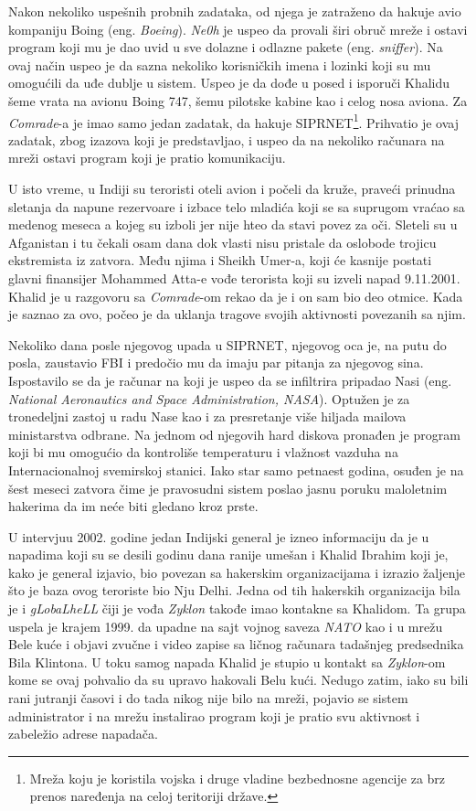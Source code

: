 \documentclass[a4paper]{article}
\begin{document}
Nakon nekoliko uspešnih probnih zadataka, od njega je zatraženo da hakuje avio kompaniju Boing (eng. \textit{Boeing}). \textit{Ne0h} je uspeo da provali širi obruč mreže i ostavi program koji mu je dao uvid u sve dolazne i odlazne pakete (eng. \textit{sniffer}). Na ovaj način uspeo je da sazna nekoliko korisničkih imena i lozinki koji su mu omogućili da uđe dublje u sistem. Uspeo je da dođe u posed i isporuči Khalidu šeme vrata na avionu Boing 747, šemu pilotske kabine kao i celog nosa aviona. Za \textit{Comrade}-a je imao samo jedan zadatak, da hakuje SIPRNET\footnote{Mreža koju je koristila vojska i druge vladine bezbednosne agencije za brz prenos naređenja na celoj teritoriji države.}. Prihvatio je ovaj zadatak, zbog izazova koji je predstavljao, i uspeo da na nekoliko računara na mreži ostavi program koji je pratio komunikaciju.

U isto vreme, u Indiji su teroristi oteli avion i počeli da kruže, praveći prinudna sletanja da napune rezervoare i izbace telo mladića koji se sa suprugom vraćao sa medenog meseca a kojeg su izboli jer nije hteo da stavi povez za oči. Sleteli su u Afganistan i tu čekali osam dana dok vlasti nisu pristale da oslobode trojicu ekstremista iz zatvora. Među njima i Sheikh Umer-a, koji će kasnije postati glavni finansijer Mohammed Atta-e vođe terorista koji su izveli napad 9.11.2001. Khalid je u razgovoru sa \textit{Comrade}-om rekao da je i on sam bio deo otmice. Kada je saznao za ovo, počeo je da uklanja tragove svojih aktivnosti povezanih sa njim.

Nekoliko dana posle njegovog upada u SIPRNET, njegovog oca je, na putu do posla, zaustavio FBI i predočio mu da imaju par pitanja za njegovog sina. Ispostavilo se da je računar na koji je uspeo da se infiltrira pripadao Nasi (eng. \textit{National Aeronautics and Space Administration, NASA}). Optužen je za tronedeljni zastoj u radu Nase kao i za presretanje više hiljada mailova ministarstva odbrane. Na jednom od njegovih hard diskova pronađen je program koji bi mu omogućio da kontroliše temperaturu i vlažnost vazduha na Internacionalnoj svemirskoj stanici. Iako star samo petnaest godina, osuđen je na šest meseci zatvora čime je pravosudni sistem poslao jasnu poruku maloletnim hakerima da im neće biti gledano kroz prste. 

U intervjuu 2002. godine jedan Indijski general je izneo informaciju da je u napadima koji su se desili godinu dana ranije umešan i Khalid Ibrahim koji je, kako je general izjavio, bio povezan sa hakerskim organizacijama i izrazio žaljenje što je baza ovog teroriste bio Nju Delhi. Jedna od tih hakerskih organizacija bila je i \textit{gLobaLheLL} čiji je vođa \textit{Zyklon} takođe imao kontakne sa Khalidom. Ta grupa uspela je krajem 1999. da upadne na sajt vojnog saveza \textit{NATO} kao i u mrežu Bele kuće i objavi zvučne i video zapise sa ličnog računara tadašnjeg predsednika Bila Klintona. U toku samog napada Khalid je stupio u kontakt sa \textit{Zyklon}-om kome se ovaj pohvalio da su upravo hakovali Belu kući. Nedugo zatim, iako su bili rani jutranji časovi i do tada nikog nije bilo na mreži, pojavio se sistem administrator i na mrežu instalirao program koji je pratio svu aktivnost i zabeležio adrese napadača.
\end{document}
